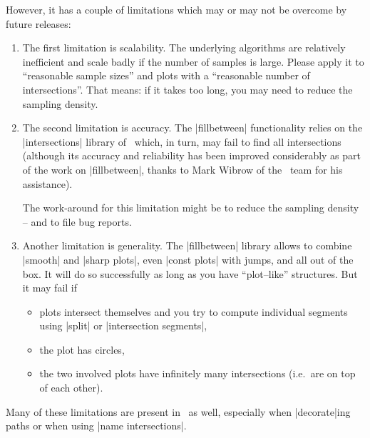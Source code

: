 However, it has a couple of limitations which may or may not be overcome by future releases:
\begin{enumerate}
	\item The first limitation is scalability. The underlying algorithms are relatively inefficient and scale badly if the number of samples is large. Please apply it to ``reasonable sample sizes'' and plots with a ``reasonable number of intersections''. That means: if it takes too long, you may need to reduce the sampling density.
	\item The second limitation is accuracy. The |fillbetween| functionality relies on the |intersections| library of \pgfname\ which, in turn, may fail to find all intersections (although its accuracy and reliability has been improved considerably as part of the work on |fillbetween|, thanks to Mark Wibrow of the \pgfname\ team for his assistance).

	The work-around for this limitation might be to reduce the sampling density -- and to file bug reports.
	\item Another limitation is generality. The |fillbetween| library allows to combine |smooth| and |sharp plots|, even |const plots| with jumps, and all out of the box. It will do so successfully as long as you have ``plot--like'' structures. But it may fail if 
		\begin{itemize}
			\item plots intersect themselves and you try to compute individual segments using |split| or |intersection segments|,
			\item the plot has circles,
			\item the two involved plots have infinitely many intersections (i.e.\ are on top of each other).
		\end{itemize}
\end{enumerate}
Many of these limitations are present in \pgfname\ as well, especially when |decorate|ing paths or when using |name intersections|.
\endgroup
